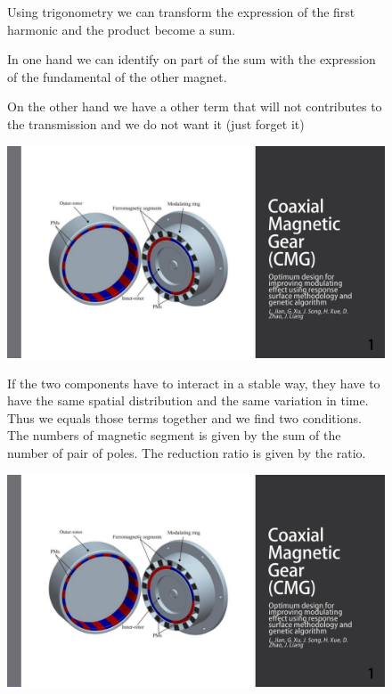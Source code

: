 \begin{figure}[H]
    \begin{minipage}{.45\linewidth}
        Using trigonometry we can transform the expression of the first harmonic and the product become a sum.
        
        In one hand we can identify on part of the sum with the expression of the fundamental of the other magnet.
        
        On the other hand we have a other term that will not contributes to the transmission and we do not want it (just forget it) 
    \end{minipage}
    \hfill%
    \begin{minipage}[c]{.45\linewidth}
        \centering
        \includegraphics[page={25},width=\textwidth]{LELEC2311.allow.pdf}
    \end{minipage}
\end{figure}

\begin{figure}[H]
    \begin{minipage}{.45\linewidth}
        If the two components have to interact in a stable way, they have to have the same spatial distribution and the same variation in time. Thus we equals those terms together and we find two conditions. The numbers of magnetic segment is given by the sum of the number of pair of poles. The reduction ratio is given by the ratio.
    \end{minipage}
    \hfill%
    \begin{minipage}[c]{.45\linewidth}
        \centering
        \includegraphics[page={26},width=\textwidth]{LELEC2311.allow.pdf}
    \end{minipage}
\end{figure}

